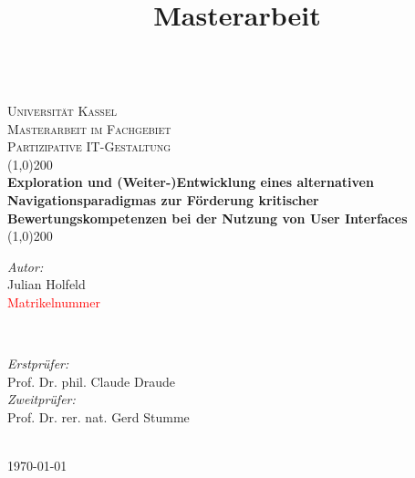 \begin{titlepage}
    \centering
    \title{Masterarbeit}
    \vspace{2cm}
    \vspace{1cm}
    \textsc{\LARGE \\ Universität Kassel}\\[0.5cm] 
    \textsc{\large Masterarbeit im Fachgebiet}\\[0.5cm] 
    \textsc{\large Partizipative IT-Gestaltung}\\[0.5cm] 
 
    \vspace{1.4cm}
    \line(1,0){200}
    \vspace{0.4cm}
    { \large \bfseries \\ Exploration und (Weiter-)Entwicklung eines alternativen Navigationsparadigmas zur Förderung kritischer Bewertungskompetenzen bei der Nutzung von User Interfaces}\\[0.2cm]
    \line(1,0){200}
    \vspace{1.5cm}\\

    \vspace{5cm}
    \begin{minipage}{0.4\textwidth}
        \begin{flushleft}
            \large\emph{Autor:}\\
            Julian Holfeld\\
            \textcolor{red}{Matrikelnummer}
        \end{flushleft}
    \end{minipage}~
    \begin{minipage}{0.4\textwidth}
        \begin{flushright}
            \large\emph{Erstprüfer:}\\
            Prof. Dr. phil. Claude Draude\\
            \large\emph{Zweitprüfer:}\\
            Prof. Dr. rer. nat. Gerd Stumme
        \end{flushright}
    \end{minipage}\\[2cm]
    {\large \today}\\[2cm]
    \vfill
\end{titlepage}
